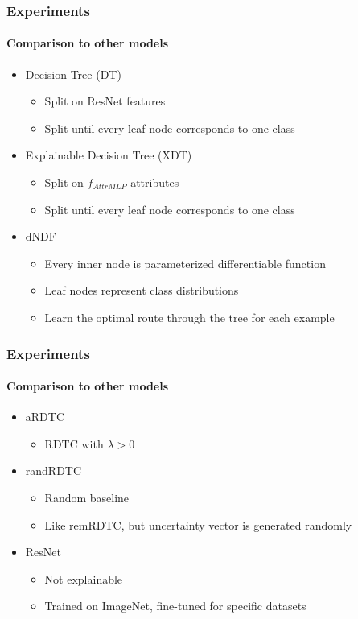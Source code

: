 \documentclass[9pt]{beamer}
\begin{document}
\begin{frame}
\frametitle{Experiments}
\framesubtitle{Comparison to other models}
\begin{itemize}
	\item Decision Tree (DT)
	\begin{itemize}
		\item Split on ResNet features
		\item Split until every leaf node corresponds to one class
	\end{itemize}
	\item Explainable Decision Tree (XDT)
	\begin{itemize}
		\item Split on $f_{AttrMLP}$ attributes
		\item Split until every leaf node corresponds to one class
	\end{itemize}
	\item dNDF \cite{kontschieder2015deep}
\begin{itemize}
	\item Every inner node is parameterized differentiable function
	\item Leaf nodes represent class distributions
	\item Learn the optimal route through the tree for each example
\end{itemize}
\end{itemize}
\end{frame}
\begin{frame}
\frametitle{Experiments}
\framesubtitle{Comparison to other models}
\begin{itemize}
	\item aRDTC
	\begin{itemize}
		\item RDTC with $\lambda>0$
	\end{itemize}
	\item randRDTC
	\begin{itemize}
		\item Random baseline
		\item Like remRDTC, but uncertainty vector is generated randomly
	\end{itemize}
	\item ResNet
	\begin{itemize}
		\item Not explainable
		\item Trained on ImageNet, fine-tuned for specific datasets
	\end{itemize}
\end{itemize}
\end{frame}
\end{document}

